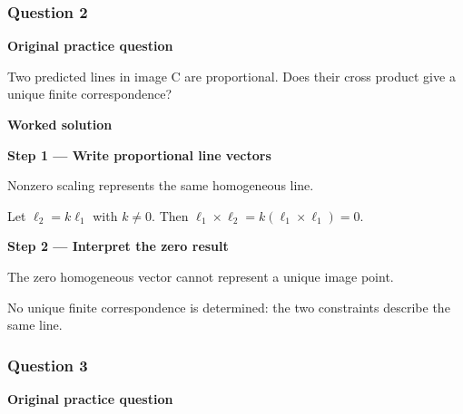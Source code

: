 \documentclass[letterpaper,11pt,english,openany,oneside]{jupyterBook}
\begin{document}
\par\medskip


\subsubsection{Question 2}
\label{\detokenize{lectures/lecture04/tldr:question-2}}\label{\detokenize{lectures/lecture04/tldr:lec04-tldr-q2}}
\par\medskip\textbf{Original practice question}\par\smallskip

\sphinxAtStartPar
Two predicted lines in image C are proportional. Does their cross product give a unique finite correspondence?

\par\medskip

\par\medskip
\textbf{Worked solution}\par\smallskip

\par\medskip{}
{\color{QuizStepRed}\bfseries Step 1 — Write proportional line vectors}\par\smallskip

\sphinxAtStartPar
{} Nonzero scaling represents the same homogeneous line.

\sphinxAtStartPar
Let {\color{QuizMathBlue} \(\ell_2=k\ell_1\)} with {\color{QuizMathBlue} \(k\ne0\)}. Then {\color{QuizMathBlue} \(\ell_1\times\ell_2=k(\ell_1\times\ell_1)=0\)}.

\par

\par\medskip{}
{\color{QuizStepRed}\bfseries Step 2 — Interpret the zero result}\par\smallskip

\sphinxAtStartPar
{} The zero homogeneous vector cannot represent a unique image point.

\sphinxAtStartPar
No unique finite correspondence is determined: the two constraints describe the same line.

\par

\par\medskip


\subsubsection{Question 3}
\label{\detokenize{lectures/lecture04/tldr:question-3}}\label{\detokenize{lectures/lecture04/tldr:lec04-tldr-q3}}
\par\medskip\textbf{Original practice question}\par\smallskip
\end{document}
